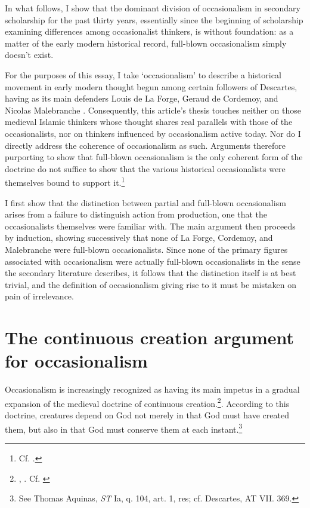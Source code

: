 In what follows, I show that the dominant division of occasionalism in secondary scholarship for the past thirty years, essentially since the beginning of scholarship examining differences among occasionalist thinkers, is without foundation: as a matter of the early modern historical record, full-blown occasionalism simply doesn't exist.

For the purposes of this essay, I take `occasionalism' to describe a historical movement in early modern thought begun among certain followers of Descartes, having as its main defenders Louis de La Forge, Geraud de Cordemoy, and Nicolas Malebranche \autocite[37]{Nadler2005}. Consequently, this article's thesis touches neither on those medieval Islamic thinkers whose thought shares real parallels with those of the occasionalists, nor on thinkers influenced by occasionalism active today. 
Nor do I directly address the coherence of occasionalism as such. Arguments therefore purporting to show that full-blown occasionalism is the only coherent form of the doctrine do not suffice to show that the various historical occasionalists were themselves bound to support it.\footnote{Cf. \autocite{Nadler1998,Winkler2011}.} 

I first show that the distinction between partial and full-blown occasionalism arises from a failure to distinguish action from production, one that the occasionalists themselves were familiar with. The main argument then proceeds by induction, showing successively that none of La Forge, Cordemoy, and Malebranche were full-blown occasionalists. Since none of the primary figures associated with occasionalism were actually full-blown occasionalists in the sense the secondary literature describes, it follows that the distinction itself is at best trivial, and the definition of occasionalism giving rise to it must be mistaken on pain of irrelevance.


\section{The continuous creation argument for occasionalism}
Occasionalism is increasingly recognized as having its main impetus in a gradual expansion of the medieval doctrine of continuous creation.\footnote{\autocite[63]{Nadler1993b}, \autocite[219]{Nadler1998}. Cf. \autocite[287]{Winkler2011}}. According to this doctrine, creatures depend on God not merely in that God must have created them, but also in that God must conserve them at each instant.\footnote{See Thomas Aquinas, \emph{ST} Ia, q. 104, art. 1, res; cf. Descartes, AT VII. 369.} 

